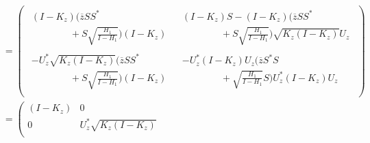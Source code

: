 \documentclass{amsart}
\begin{document}
\begin{align*}
                                    &=\left(
                                      \begin{array}{cc}
                                         \begin{array}{c}
                                           (I - K_z)(\overline{z}SS^{*}  \\
                                           \qquad \qquad + S\sqrt{\frac{H_1}{I - H_1}})(I - K_z)
                                         \end{array}
                                         & \begin{array}{c}
                                             (I - K_z)S-(I - K_z)(\overline{z}SS^{*}   \\
                                             \qquad \qquad + S\sqrt{\frac{H_1}{I - H_1}})\sqrt{K_{z}(I-K_{z})}U_{z}
                                           \end{array}
                                          \\
                                        \begin{array}{c}
                                        -U_{z}^{*}\sqrt{K_{z}(I-K_{z})}(\overline{z}SS^{*}  \\
                                         \qquad \qquad  + S\sqrt{\frac{H_1}{I - H_1}})(I - K_z)
                                        \end{array}
                                        & \begin{array}{c}
                                            -U^{*}_{z}(I - K_z)U_{z}(\overline{z}S^{*}S  \\
                                             \qquad \qquad + \sqrt{\frac{H_1}{I - H_1}}S )U^{*}_{z}(I - K_z)U_{z}
                                          \end{array}
                                         \\
                                      \end{array}
                                    \right)\\
                                    &=\left(
                                       \begin{array}{cc}
                                         (I-K_z) & 0 \\
                                         0 & U^{*}_{z}\sqrt{K_{z}(I-K_{z})} \\
                                       \end{array}

\end{align*}
\end{document}
